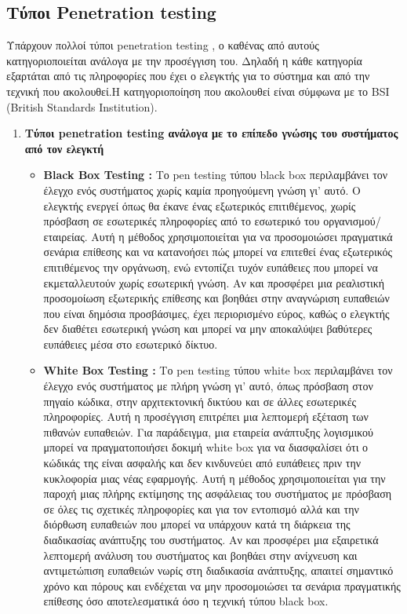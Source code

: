 \subsection{\gt Τύποι \lt Penetration testing}
{ 
\hspace*{2em} Υπάρχουν πολλοί τύποι \lt penetration testing \gt , ο καθένας από αυτούς κατηγοριοποιείται ανάλογα με την προσέγγιση του. Δηλαδή η κάθε κατηγορία εξαρτάται από τις πληροφορίες που έχει ο ελεγκτής για το σύστημα  και από την τεχνική που ακολουθεί.Η κατηγοριοποίηση που ακολουθεί είναι σύμφωνα με το \lt BSI (British Standards Institution). \gt
\begin{enumerate}
    \item{\textbf{ Τύποι \lt penetration testing \gt ανάλογα με το επίπεδο γνώσης του  συστήματος από τον ελεγκτή }}
    \begin{itemize}
        \item \lt \textbf{Black Box Testing :} \gt Το \lt pen testing \gt τύπου \lt black box \gt περιλαμβάνει τον έλεγχο ενός συστήματος χωρίς καμία προηγούμενη γνώση γι' αυτό. Ο ελεγκτής ενεργεί όπως θα έκανε ένας εξωτερικός επιτιθέμενος, χωρίς πρόσβαση σε εσωτερικές πληροφορίες από το εσωτερικό του οργανισμού/εταιρείας. Αυτή η μέθοδος χρησιμοποιείται για να προσομοιώσει πραγματικά σενάρια επίθεσης και να κατανοήσει πώς μπορεί να επιτεθεί ένας εξωτερικός επιτιθέμενος την οργάνωση, ενώ εντοπίζει τυχόν ευπάθειες που μπορεί να εκμεταλλευτούν χωρίς εσωτερική γνώση. Αν και προσφέρει μια ρεαλιστική προσομοίωση εξωτερικής επίθεσης και βοηθάει στην αναγνώριση ευπαθειών που είναι δημόσια προσβάσιμες, έχει περιορισμένο εύρος, καθώς ο ελεγκτής δεν διαθέτει εσωτερική γνώση και μπορεί να μην αποκαλύψει βαθύτερες ευπάθειες μέσα στο εσωτερικό δίκτυο.
        \item \lt \textbf{White Box Testing :} \gt Το \lt pen testing \gt τύπου \lt white box περιλαμβάνει τον έλεγχο ενός συστήματος με πλήρη γνώση γι' αυτό, όπως πρόσβαση στον πηγαίο κώδικα, στην αρχιτεκτονική δικτύου και σε άλλες εσωτερικές πληροφορίες. Αυτή η προσέγγιση επιτρέπει μια λεπτομερή εξέταση των πιθανών ευπαθειών. Για παράδειγμα, μια εταιρεία ανάπτυξης λογισμικού μπορεί να πραγματοποιήσει δοκιμή white box για να διασφαλίσει ότι ο κώδικάς της είναι ασφαλής και δεν κινδυνεύει από ευπάθειες πριν την κυκλοφορία μιας νέας εφαρμογής. Αυτή η μέθοδος χρησιμοποιείται για την παροχή μιας πλήρης εκτίμησης της ασφάλειας του συστήματος  με πρόσβαση σε όλες τις σχετικές πληροφορίες και για τον εντοπισμό αλλά και την διόρθωση ευπαθειών που μπορεί να υπάρχουν κατά τη διάρκεια της διαδικασίας ανάπτυξης του συστήματος. Αν και προσφέρει μια εξαιρετικά λεπτομερή ανάλυση του συστήματος και βοηθάει στην ανίχνευση και αντιμετώπιση ευπαθειών νωρίς στη διαδικασία ανάπτυξης, απαιτεί σημαντικό χρόνο και πόρους και ενδέχεται να μην προσομοιώσει τα σενάρια πραγματικής επίθεσης όσο αποτελεσματικά όσο η τεχνική τύπου \lt black box.

\end{itemize}
\end{enumerate}}

